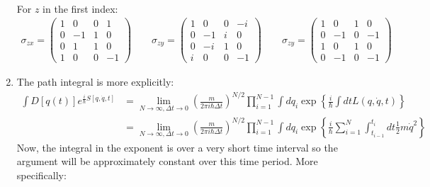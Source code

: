 \documentclass[12pt,a4]{article}
\begin{document}
\begin{enumerate}
\begin{align*}
    \end{align*}
    For $z$ in the first index:
    \begin{align*}
      \sigma_{zx} =   \left(\begin{matrix}
                        1 &  0 & 0 &  1\\
                        0 & -1 & 1 &  0\\
                        0 &  1 & 1 &  0\\
                        1 &  0 & 0 & -1
                      \end{matrix} \right)
                      \qquad
      \sigma_{zy} =   \left(\begin{matrix}
                        1 &  0 & 0 & -i\\
                        0 & -1 & i &  0\\
                        0 & -i & 1 &  0\\
                        i &  0 & 0 & -1
                      \end{matrix} \right)
                      \qquad
      \sigma_{zy} =   \left(\begin{matrix}
                        1 &  0 & 1 &  0\\
                        0 & -1 & 0 & -1\\
                        1 &  0 & 1 &  0\\
                        0 & -1 & 0 & -1
                      \end{matrix} \right)
    \end{align*}
  \item
    The path integral is more explicitly:
    \begin{align*}
      \int D[q(t)] e^{\frac{i}{\hbar} S[q, \dot q, t]} &=\lim_{N \to \infty, \Delta t\to 0} \left(\frac{m}{2 \pi i \hbar \Delta t}\right)^{N / 2}\prod_{i = 1}^{N - 1} \int  dq_i \exp\left\{\frac{i}{\hbar}\int dt L(q, \dot q, t)\right\}\\
                                                       &=\lim_{N \to \infty, \Delta t \to 0}\left(\frac{m}{2 \pi i \hbar \Delta t}\right)^{N / 2} \prod_{i = 1}^{N - 1}\int  dq_i \exp\left\{\frac{i}{\hbar}\sum_{i = 1}^{N}\int_{t_{i-1}}^{t_i} dt \frac{1}{2} m \dot q^2\right\}
    \end{align*}
    Now, the integral in the exponent is over a very short time interval so the argument will be approximately constant over this time period.
    More specifically:
    \begin{equation*}

\end{equation*}
\end{enumerate}
\end{document}
